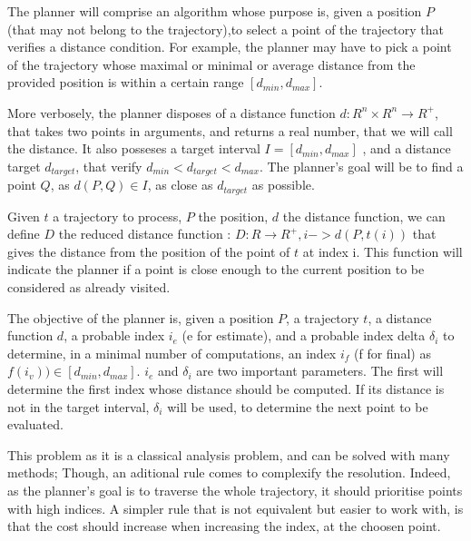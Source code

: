 The planner will comprise an algorithm whose purpose is, given a position $P$ (that may not belong to 
the trajectory),to select a point of the trajectory that verifies a distance condition.
For example, the planner may have to pick a point of the trajectory whose maximal or minimal or average 
distance from the provided position is within a certain range $[d_{min}, d_{max}]$.
\newline

More verbosely, the planner disposes of a distance function $d : R^n \times R^n \rightarrow R^+$, 
that takes two points in arguments, and returns a real number, that we will call the distance.
It also posseses a target interval $I = [d_{min}, d_{max}]$ , and a distance target $d_{target}$, that verify
 $d_{min} < d_{target} < d_{max}$.
The planner's goal will be to find a point $Q$, as $d(P, Q) \in I$, as close as $d_{target}$ as possible.
\newline

Given $t$ a trajectory to process, $P$ the position, $d$ the distance function, we can define $D$ the reduced
 distance function :
$D : R \rightarrow R^+, i -> d(P, t(i))$ 
that gives the distance from the position of the point of $t$ at index i.
This function will indicate the planner if a point is close enough to the current position to be considered
as already visited. 
\newline

The objective of the planner is, given a position $P$, a trajectory $t$, a distance function $d$, 
a probable index $i_e$ (e for estimate), and a probable index delta $\delta _i$ to determine, in a minimal 
number of computations, an index $i_f$ (f for final) as $f(i_v)) \in [d_{min}, d_{max}]$.
$i_e$ and $\delta _i$ are two important parameters. The first will determine the first index whose distance
should be computed. If its distance is not in the target interval, $\delta _i$ will be used, to determine the
next point to be evaluated. 
\newline 

This problem as it is a classical analysis problem, and can be solved with many methods;
Though, an aditional rule comes to complexify the resolution. 
Indeed, as the planner's goal is to traverse the whole trajectory, it should prioritise points with high
indices. A simpler rule that is not equivalent but easier to work with, is that the cost should increase 
when increasing the index, at the choosen point.
\newline

